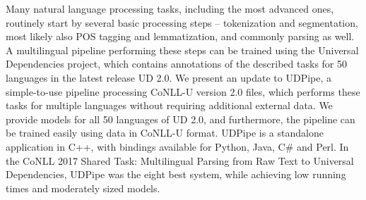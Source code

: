 Many natural language processing tasks, including the most advanced ones, routinely start by several basic processing steps -- tokenization and segmentation, most likely also POS tagging and lemmatization, and commonly parsing as well. A multilingual pipeline performing these steps can be trained using the Universal Dependencies project, which contains annotations of the described tasks for 50 languages in the latest release UD 2.0. We present an update to UDPipe, a simple-to-use pipeline processing CoNLL-U version 2.0 files, which performs these tasks for multiple languages without requiring additional external data.  We provide models for all 50 languages of UD 2.0, and furthermore, the pipeline can be trained easily using data in CoNLL-U format.  UDPipe is a standalone application in C++, with bindings available for Python, Java, C\# and Perl. In the CoNLL 2017 Shared Task: Multilingual Parsing from Raw Text to Universal Dependencies, UDPipe was the eight best system, while achieving low running times and moderately sized models.
